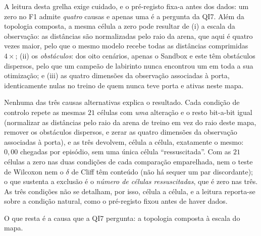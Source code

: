 A leitura desta grelha exige cuidado, e o pré-registo fixa-a antes dos dados: um
zero no F1 admite \emph{quatro} causas e apenas uma é a pergunta da QI7. Além
da topologia composta, a mesma célula a zero pode resultar de (i) a escala da
observação: as distâncias são normalizadas pelo raio da arena, que aqui é
quatro vezes maior, pelo que o mesmo modelo recebe todas as distâncias
comprimidas $4\times$; (ii) os \emph{obstáculos}: dos oito cenários, apenas
o Sandbox e este têm obstáculos dispersos, pelo que um campeão de labirinto nunca
encontrou um em toda a sua otimização; e (iii) as quatro dimensões da observação
associadas à porta, identicamente nulas no treino de quem nunca teve porta e
ativas neste mapa.

Nenhuma das três causas alternativas explica o resultado. Cada condição de
controlo repete as mesmas $21$ células com \emph{uma} alteração e o resto
bit-a-bit igual (normalizar as distâncias pelo raio da arena de treino em vez
do raio deste mapa, remover os obstáculos dispersos, e zerar as quatro dimensões
da observação associadas à porta), e as três devolvem, célula a célula,
exatamente o mesmo: $0{,}00$ chegadas por episódio, sem uma única célula
``ressuscitada''. Com as $21$ células a zero nas duas condições de cada
comparação emparelhada, nem o teste de Wilcoxon nem o $\delta$ de Cliff têm
conteúdo (não há sequer um par discordante); o que sustenta a exclusão é o
\emph{número de células ressuscitadas}, que é zero nas três. As três condições não se
detalham, por isso, célula a célula, e a leitura reporta-se sobre a condição
natural, como o pré-registo fixou antes de haver dados.

O que resta é a causa que a QI7 pergunta: a topologia composta à escala do mapa.

